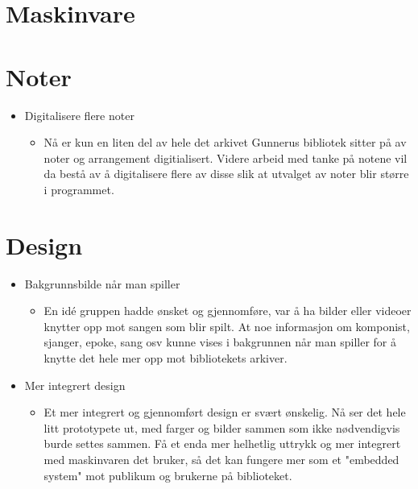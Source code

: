 \section{Maskinvare}



\section{Noter}
\begin{itemize}

\item{Digitalisere flere noter}
\begin{itemize}
\item{Nå er kun en liten del av hele det arkivet Gunnerus bibliotek sitter på av noter og arrangement digitialisert. Videre arbeid med tanke på notene vil da bestå av å digitalisere flere av disse slik at utvalget av noter blir større i programmet.}
\end{itemize}

\end{itemize}


\section{Design}
\begin{itemize}

\item{Bakgrunnsbilde når man spiller}
\begin{itemize}
\item{En idé gruppen hadde ønsket og gjennomføre, var å ha bilder eller videoer knytter opp mot sangen som blir spilt. At noe informasjon om komponist, sjanger, epoke, sang osv kunne vises i bakgrunnen når man spiller for å knytte det hele mer opp mot bibliotekets arkiver.}
\end{itemize}

\item{Mer integrert design}
\begin{itemize}
\item{Et mer integrert og gjennomført design er svært ønskelig. Nå ser det hele litt prototypete ut, med farger og bilder sammen som ikke nødvendigvis burde settes sammen. Få et enda mer helhetlig uttrykk og mer integrert med maskinvaren det bruker, så det kan fungere mer som et "embedded system"\cite{embeddedSystem} mot publikum og brukerne på biblioteket.}
\end{itemize}

\end{itemize}